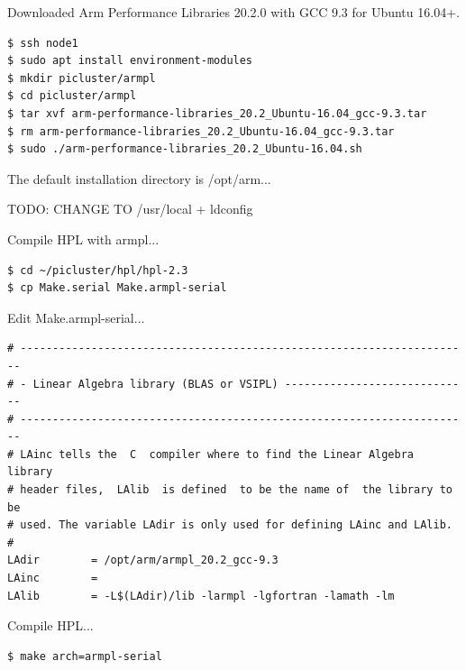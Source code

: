 \documentclass{report}
\begin{document}
Downloaded Arm Performance Libraries 20.2.0 with GCC 9.3 for Ubuntu 16.04+.

\lstset{style=termstyle}
\begin{lstlisting}
$ ssh node1
$ sudo apt install environment-modules
$ mkdir picluster/armpl
$ cd picluster/armpl
$ tar xvf arm-performance-libraries_20.2_Ubuntu-16.04_gcc-9.3.tar
$ rm arm-performance-libraries_20.2_Ubuntu-16.04_gcc-9.3.tar
$ sudo ./arm-performance-libraries_20.2_Ubuntu-16.04.sh
\end{lstlisting}

The default installation directory is /opt/arm...

TODO: CHANGE TO /usr/local + ldconfig

Compile HPL with armpl...

\lstset{style=termstyle}
\begin{lstlisting}
$ cd ~/picluster/hpl/hpl-2.3
$ cp Make.serial Make.armpl-serial
\end{lstlisting}

Edit Make.armpl-serial...

\lstset{style=listingstyle}
\begin{lstlisting}[caption=Make.armpl-serial extract]
# ----------------------------------------------------------------------
# - Linear Algebra library (BLAS or VSIPL) -----------------------------
# ----------------------------------------------------------------------
# LAinc tells the  C  compiler where to find the Linear Algebra  library
# header files,  LAlib  is defined  to be the name of  the library to be 
# used. The variable LAdir is only used for defining LAinc and LAlib.
#
LAdir        = /opt/arm/armpl_20.2_gcc-9.3
LAinc        =
LAlib        = -L$(LAdir)/lib -larmpl -lgfortran -lamath -lm
\end{lstlisting}

Compile HPL...

\lstset{style=termstyle}
\begin{lstlisting}[]
$ make arch=armpl-serial
\end{lstlisting}



%
%
\end{document}
